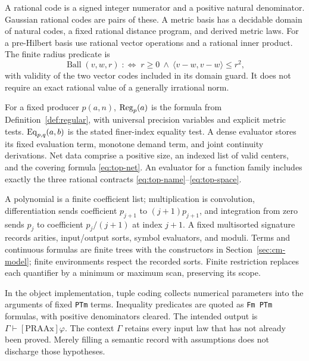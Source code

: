 \begin{description}[style=nextline,leftmargin=1em]
\item[Rational and dense codes.]
A rational code is a signed integer numerator and a positive natural
denominator. Gaussian rational codes are pairs of these. A metric basis
has a decidable domain of natural codes, a fixed rational distance program,
and derived metric laws. For a pre-Hilbert basis use rational vector
operations and a rational inner product. The finite radius predicate is
\[
 \operatorname{Ball}(v,w,r)\;:\Longleftrightarrow\;
 r\geq0\ \land\ \langle v-w,v-w\rangle\leq r^2,
 \tag{F1}\label{eq:formal-ball}
\]
with validity of the two vector codes included in its domain guard.
It does not require an exact rational value of a generally irrational norm.

\item[Names, moduli, and observation contracts.]
For a fixed producer \(p(a,n)\), \(\operatorname{Reg}_p(a)\) is the formula from
Definition~\ref{def:regular}, with universal precision variables and
explicit metric tests. \(\operatorname{Eq}_{p,q}(a,b)\) is the stated finer-index equality
test. A dense evaluator stores its fixed evaluation term, monotone demand
term, and joint continuity derivations. Net data comprise a positive size,
an indexed list of valid centers, and the covering formula
\eqref{eq:top-net}. An evaluator for a function family includes exactly the
three rational contracts \eqref{eq:top-name}--\eqref{eq:top-space}.

\item[Polynomial and formula codes.]
A polynomial is a finite coefficient list; multiplication is convolution,
differentiation sends coefficient \(p_{j+1}\) to \((j+1)p_{j+1}\), and
integration from zero sends \(p_j\) to coefficient \(p_j/(j+1)\) at
index \(j+1\). A fixed multisorted signature records arities, input/output
sorts, symbol evaluators, and moduli. Terms and continuous formulas are
finite trees with the constructors in Section~\ref{sec:cm-model}; finite
environments respect the recorded sorts. Finite restriction replaces each
quantifier by a minimum or maximum scan, preserving its scope.
\end{description}

In the object implementation, tuple coding collects numerical parameters
into the arguments of fixed \texttt{PTm} terms. Inequality predicates are
quoted as \texttt{Fm PTm} formulas, with positive denominators cleared.
The intended output is \(\Gamma\vdash[\mathrm{PRAAx}]\varphi\).
The context \(\Gamma\) retains every input law that has not already been
proved. Merely filling a semantic record with assumptions does not
discharge those hypotheses.

